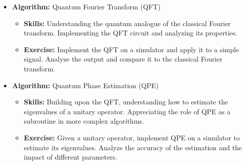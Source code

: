 \begin{itemize}
    \item \textbf{Algorithm:} Quantum Fourier Transform (QFT)
    \begin{itemize}
        \item \textbf{Skills:} Understanding the quantum analogue of the classical Fourier transform. Implementing the QFT circuit and analyzing its properties.
        \item \textbf{Exercise:} Implement the QFT on a simulator and apply it to a simple signal. Analyze the output and compare it to the classical Fourier transform.
    \end{itemize}
    
    \item \textbf{Algorithm:} Quantum Phase Estimation (QPE)
    \begin{itemize}
        \item \textbf{Skills:} Building upon the QFT, understanding how to estimate the eigenvalues of a unitary operator. Appreciating the role of QPE as a subroutine in more complex algorithms.
        \item \textbf{Exercise:} Given a unitary operator, implement QPE on a simulator to estimate its eigenvalues. Analyze the accuracy of the estimation and the impact of different parameters.
    \end{itemize}
\end{itemize}

